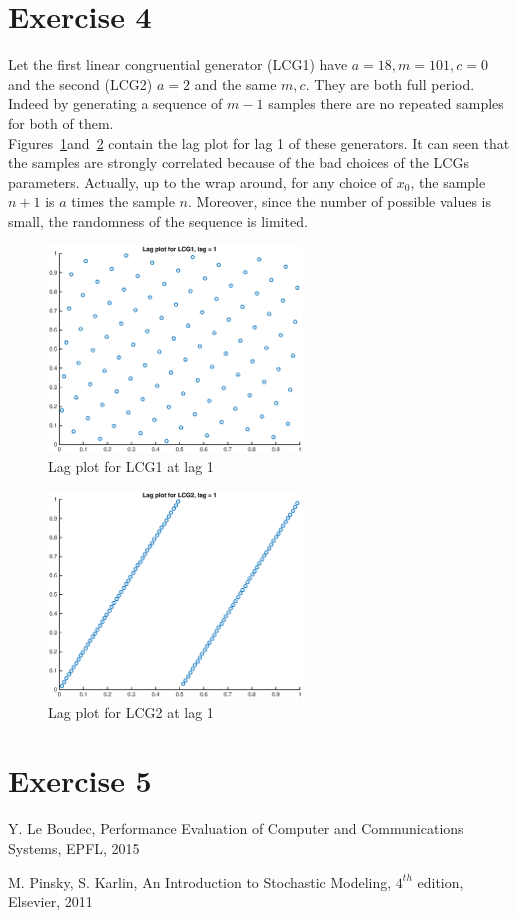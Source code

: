 \documentclass[10pt]{article}
\begin{document}
\section{Exercise 4}
Let the first linear congruential generator (LCG1) have $a = 18, m = 101, c = 0$ and the second (LCG2) $a = 2$ and the same $m, c$. They are both full period. Indeed by generating a sequence of $m-1$ samples there are no repeated samples for both of them. \\
Figures~\ref{fig:lcg1}and~\ref{fig:lcg2} contain the lag plot for lag 1 of these generators. It can seen that the samples are strongly correlated because of the bad choices of the LCGs parameters. Actually, up to the wrap around, for any choice of $x_0$, the sample $n+1$ is $a$ times the sample $n$. Moreover, since the number of possible values is small, the randomness of the sequence is limited.

\begin{figure}
  \centering
  \includegraphics[width = 0.6\textwidth]{images/hw2_4_lcg1}
  \caption{Lag plot for LCG1 at lag 1}
  \label{fig:lcg1}
\end{figure}

\begin{figure}
  \centering
  \includegraphics[width = 0.6\textwidth]{images/hw2_4_lcg2}
  \caption{Lag plot for LCG2 at lag 1}
  \label{fig:lcg2}
\end{figure}

\section{Exercise 5}


\begin{thebibliography}{10}

Y. Le Boudec, Performance Evaluation of Computer and Communications Systems, EPFL, 2015

M. Pinsky, S. Karlin, An Introduction to Stochastic Modeling, $4^{th}$ edition, Elsevier, 2011


\end{thebibliography}
\end{document}
